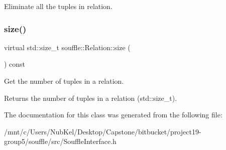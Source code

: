 Eliminate all the tuples in relation. \mbox{\label{classsouffle_1_1_relation_a7943e499688e4c73e293ed9db53bc329}} 
\subsubsection{\texorpdfstring{size()}{size()}}
{\footnotesize\ttfamily virtual std\+::size\+\_\+t souffle\+::\+Relation\+::size (\begin{DoxyParamCaption}{ }\end{DoxyParamCaption}) const\hspace{0.3cm}{\ttfamily [pure virtual]}}

Get the number of tuples in a relation. \begin{DoxyReturn}{Returns}
the number of tuples in a relation (std\+::size\+\_\+t). 
\end{DoxyReturn}


The documentation for this class was generated from the following file\+:\begin{DoxyCompactItemize}
\item 
/mnt/c/\+Users/\+Nub\+Kel/\+Desktop/\+Capstone/bitbucket/project19-\/group5/souffle/src/Souffle\+Interface.\+h\end{DoxyCompactItemize}
